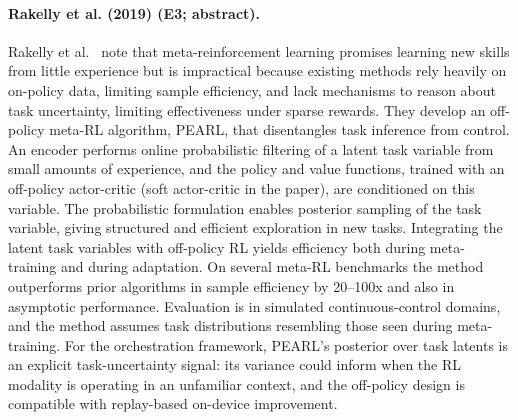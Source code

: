 \documentclass[10pt,a4paper]{article}
\begin{document}
\paragraph{Rakelly et al. (2019) (E3; abstract).} Rakelly et al.~\cite{Rakelly2019} note that meta-reinforcement learning promises learning new skills from little experience but is impractical because existing methods rely heavily on on-policy data, limiting sample efficiency, and lack mechanisms to reason about task uncertainty, limiting effectiveness under sparse rewards. They develop an off-policy meta-RL algorithm, PEARL, that disentangles task inference from control. An encoder performs online probabilistic filtering of a latent task variable from small amounts of experience, and the policy and value functions, trained with an off-policy actor-critic (soft actor-critic in the paper), are conditioned on this variable. The probabilistic formulation enables posterior sampling of the task variable, giving structured and efficient exploration in new tasks. Integrating the latent task variables with off-policy RL yields efficiency both during meta-training and during adaptation. On several meta-RL benchmarks the method outperforms prior algorithms in sample efficiency by 20--100x and also in asymptotic performance. Evaluation is in simulated continuous-control domains, and the method assumes task distributions resembling those seen during meta-training. For the orchestration framework, PEARL's posterior over task latents is an explicit task-uncertainty signal: its variance could inform when the RL modality is operating in an unfamiliar context, and the off-policy design is compatible with replay-based on-device improvement.
\end{document}
